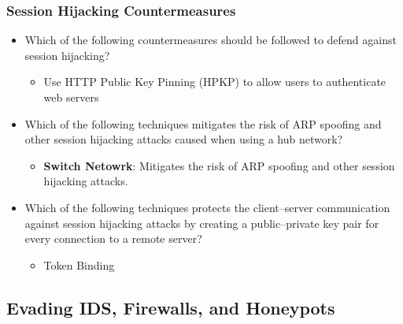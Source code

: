 \subsubsection{Session Hijacking Countermeasures}
\begin{itemize}
    \item Which of the following countermeasures should be followed to defend against session hijacking?
    \begin{itemize}
        \item Use HTTP Public Key Pinning (HPKP) to allow users to authenticate web servers
    \end{itemize}
    \item Which of the following techniques mitigates the risk of ARP spoofing and other session hijacking attacks caused when using a hub network?
    \begin{itemize}
        \item \textbf{Switch Netowrk}: Mitigates the risk of ARP spoofing and other session hijacking attacks.
    \end{itemize}
    \item Which of the following techniques protects the client–server communication against session hijacking attacks by creating a public–private key pair for every connection to a remote server?
    \begin{itemize}
        \item Token Binding
    \end{itemize}
\end{itemize}


\subsection{Evading IDS, Firewalls, and Honeypots}
